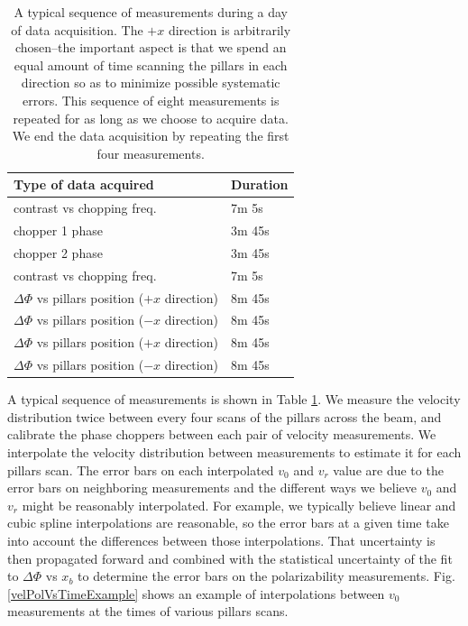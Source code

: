 \documentclass[twocolumn,prl,showpacs,superscriptaddress]{revtex4-1}   %
\newcommand{\figref}[1]{Fig. \ref{#1}}
\begin{document}
\begingroup
\begin{table}
\caption{\label{schedule}A typical sequence of measurements during a day of data acquisition. The $+x$ direction is arbitrarily chosen--the important aspect is that we spend an equal amount of time scanning the pillars in each direction so as to minimize possible systematic errors. This sequence of eight measurements is repeated for as long as we choose to acquire data. We end the data acquisition by repeating the first four measurements.}
\begin{center}
\begin{tabular}{l l}
\hline
\hline
Type of data acquired & Duration \\
\hline
contrast vs chopping freq. & 7m 5s \\
chopper 1 phase & 3m 45s \\
chopper 2 phase & 3m 45s\\
contrast vs chopping freq. & 7m 5s \\
$\Delta\Phi$ vs pillars position ($+x$ direction) & 8m 45s \\
$\Delta\Phi$ vs pillars position ($-x$ direction) & 8m 45s \\
$\Delta\Phi$ vs pillars position ($+x$ direction) & 8m 45s \\
$\Delta\Phi$ vs pillars position ($-x$ direction) & 8m 45s \\
\hline
\hline
\end{tabular}
\end{center}
\end{table}
\endgroup

A typical sequence of measurements is shown in Table \ref{schedule}.
We measure the velocity distribution twice between every four scans of the pillars across the beam, and calibrate the phase choppers between each pair of velocity measurements.
We interpolate the velocity distribution between measurements to estimate it for each pillars scan. The error bars on each interpolated $v_0$ and $v_r$ value are due to the error bars on neighboring measurements and the different ways we believe $v_0$ and $v_r$ might be reasonably interpolated. For example, we typically believe linear and cubic spline interpolations are reasonable, so the error bars at a given time take into account the differences between those interpolations. That uncertainty is then propagated forward and combined with the statistical uncertainty of the fit to $\Delta\Phi$ vs $x_b$ to determine the error bars on the polarizability measurements. \figref{velPolVsTimeExample} shows an example of interpolations between $v_0$ measurements at the times of various pillars scans.
\end{document}
